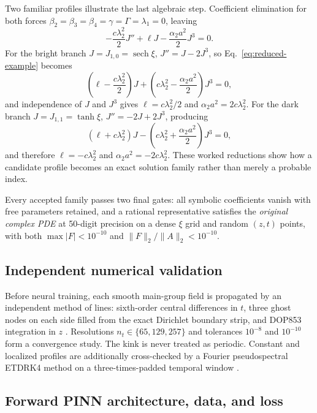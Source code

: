 \documentclass[11pt]{article}
\newcommand{\sech}{\operatorname{sech}}
\begin{document}
Two familiar profiles illustrate the last algebraic step.  Coefficient
elimination for both forces
$\beta_2=\beta_3=\beta_4=\gamma=\Gamma=\lambda_1=0$, leaving
\begin{equation}
-\frac{c\lambda_2^2}{2}J''+\ell J
-\frac{\alpha_2a^2}{2}J^3=0.
\label{eq:reduced-example}
\end{equation}
For the bright branch $J=J_{1,0}=\sech\xi$,
$J''=J-2J^3$, so Eq.~\eqref{eq:reduced-example} becomes
\begin{equation}
\left(\ell-\frac{c\lambda_2^2}{2}\right)J
+\left(c\lambda_2^2-\frac{\alpha_2a^2}{2}\right)J^3=0,
\end{equation}
and independence of $J$ and $J^3$ gives
$\ell=c\lambda_2^2/2$ and $\alpha_2a^2=2c\lambda_2^2$.  For the dark branch
$J=J_{1,1}=\tanh\xi$, $J''=-2J+2J^3$, producing
\begin{equation}
(\ell+c\lambda_2^2)J
-\left(c\lambda_2^2+\frac{\alpha_2a^2}{2}\right)J^3=0,
\end{equation}
and therefore $\ell=-c\lambda_2^2$ and
$\alpha_2a^2=-2c\lambda_2^2$.  These worked reductions show how a candidate
profile becomes an exact solution family rather than merely a probable index.

Every accepted family passes two final gates: all symbolic coefficients vanish
with free parameters retained, and a rational representative satisfies the
\emph{original complex PDE} at 50-digit precision on a dense $\xi$ grid and
random $(z,t)$ points, with both $\max|F|<10^{-10}$ and
$\|F\|_2/\|A\|_2<10^{-10}$.

\subsection{Independent numerical validation}

Before neural training, each smooth main-group field is propagated by an
independent method of lines: sixth-order central differences in $t$, three
ghost nodes on each side filled from the exact Dirichlet boundary strip, and
DOP853 integration in $z$ \citep{hairer1993}.  Resolutions
$n_t\in\{65,129,257\}$ and tolerances
$10^{-8}$ and $10^{-10}$ form a convergence study.  The kink is never treated
as periodic.  Constant and localized profiles are additionally cross-checked
by a Fourier pseudospectral ETDRK4 method on a three-times-padded temporal
window \citep{kassam2005}.

\subsection{Forward PINN architecture, data, and loss}
\label{sec:forward-method}
\end{document}
